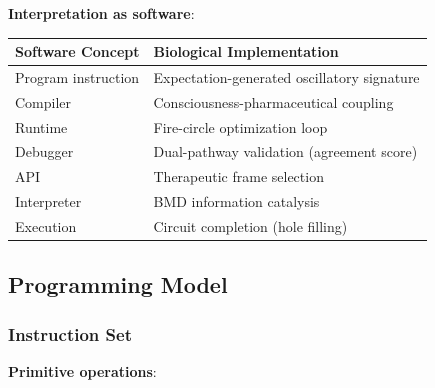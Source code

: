 \documentclass[11pt,a4paper]{article}
\begin{document}
\textbf{Interpretation as software}:

\begin{center}
\begin{tabular}{ll}
\toprule
\textbf{Software Concept} & \textbf{Biological Implementation} \\
\midrule
Program instruction & Expectation-generated oscillatory signature \\
Compiler & Consciousness-pharmaceutical coupling \\
Runtime & Fire-circle optimization loop \\
Debugger & Dual-pathway validation (agreement score) \\
API & Therapeutic frame selection \\
Interpreter & BMD information catalysis \\
Execution & Circuit completion (hole filling) \\
\bottomrule
\end{tabular}
\end{center}

\subsection{Programming Model}

\subsubsection{Instruction Set}

\textbf{Primitive operations}:
\end{document}
